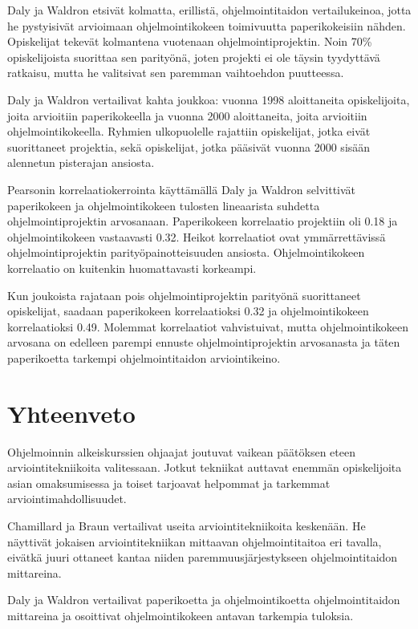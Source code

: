\documentclass[finnish]{../tktltiki2}
\theoremstyle{definition}
\theoremstyle{remark}
\begin{document}
Daly ja Waldron etsivät kolmatta, erillistä, ohjelmointitaidon vertailukeinoa, jotta he pystyisivät arvioimaan ohjelmointikokeen toimivuutta paperikokeisiin nähden. Opiskelijat tekevät kolmantena vuotenaan ohjelmointiprojektin. Noin 70\% opiskelijoista suorittaa sen parityönä, joten projekti ei ole täysin tyydyttävä ratkaisu, mutta he valitsivat sen paremman vaihtoehdon puutteessa.

Daly ja Waldron vertailivat kahta joukkoa: vuonna 1998 aloittaneita opiskelijoita, joita arvioitiin paperikokeella ja vuonna 2000 aloittaneita, joita arvioitiin ohjelmointikokeella. Ryhmien ulkopuolelle rajattiin opiskelijat, jotka eivät suorittaneet projektia, sekä opiskelijat, jotka pääsivät vuonna 2000 sisään alennetun pisterajan ansiosta.

Pearsonin korrelaatiokerrointa käyttämällä Daly ja Waldron selvittivät paperikokeen ja ohjelmointikokeen tulosten lineaarista suhdetta ohjelmointiprojektin arvosanaan. Paperikokeen korrelaatio projektiin oli 0.18 ja ohjelmointikokeen vastaavasti 0.32. Heikot korrelaatiot ovat ymmärrettävissä ohjelmointiprojektin parityöpainotteisuuden ansiosta. Ohjelmointikokeen korrelaatio on kuitenkin huomattavasti korkeampi.

Kun joukoista rajataan pois ohjelmointiprojektin parityönä suorittaneet opiskelijat, saadaan paperikokeen korrelaatioksi 0.32 ja ohjelmointikokeen korrelaatioksi 0.49. Molemmat korrelaatiot vahvistuivat, mutta ohjelmointikokeen arvosana on edelleen parempi ennuste ohjelmointiprojektin arvosanasta ja täten paperikoetta tarkempi ohjelmointitaidon arviointikeino.

\section{Yhteenveto}

Ohjelmoinnin alkeiskurssien ohjaajat joutuvat vaikean päätöksen eteen arviointitekniikoita valitessaan. Jotkut tekniikat auttavat enemmän opiskelijoita asian omaksumisessa ja toiset tarjoavat helpommat ja tarkemmat arviointimahdollisuudet.

Chamillard ja Braun vertailivat useita arviointitekniikoita keskenään. He näyttivät jokaisen arviointitekniikan mittaavan ohjelmointitaitoa eri tavalla, eivätkä juuri ottaneet kantaa niiden paremmuusjärjestykseen ohjelmointitaidon mittareina.

Daly ja Waldron vertailivat paperikoetta ja ohjelmointikoetta ohjelmointitaidon mittareina ja osoittivat ohjelmointikokeen antavan tarkempia tuloksia.





\end{document}
